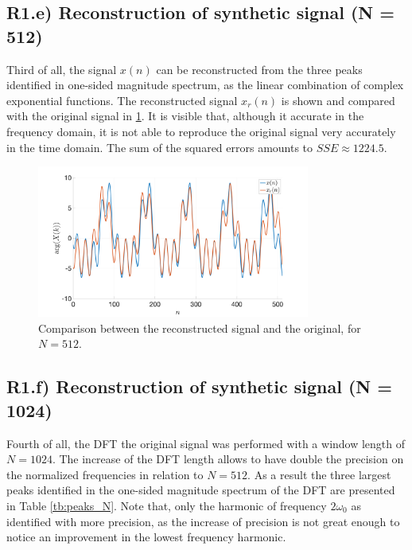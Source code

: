 \documentclass[]{scrartcl}
\begin{document}
\subsection{R1.e) Reconstruction of synthetic signal (N = 512)}

Third of all, the signal $x(n)$ can be reconstructed from the three peaks identified in one-sided magnitude spectrum, as the linear combination of complex exponential functions. The reconstructed signal $x_r(n)$ is shown and compared with the original signal in \ref{fig:R1e}. It is visible that, although it accurate in the frequency domain, it is not able to reproduce the original signal very accurately in the time domain. The sum of the squared errors amounts to $SSE \approx 1224.5$.

\begin{figure}[htbp]
	\centering
	\includegraphics[width= 0.8\textwidth]{figures/R1e.png}
	\caption{Comparison between the reconstructed signal and the original, for $N = 512$.}
	\label{fig:R1e}
\end{figure}

\subsection{R1.f) Reconstruction of synthetic signal (N = 1024)}

Fourth of all, the DFT the original signal was performed with a window length of $N= 1024$. The increase of the DFT length allows to have double the precision on the normalized frequencies in relation to $N = 512$. As a result the three largest peaks identified in the one-sided magnitude spectrum of the DFT are presented in Table \ref{tb:peaks_N}. Note that, only the harmonic of frequency $2\omega_0$ as identified with more precision, as the increase of precision is not great enough to notice an improvement in the lowest frequency harmonic.
\end{document}
